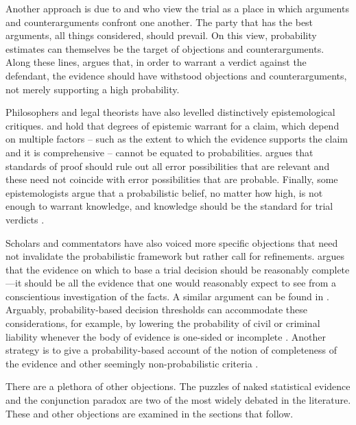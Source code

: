 \documentclass{article}
\begin{document}
Another approach is due to \cite{gordon2007} and \cite{prakken2009} who view the trial as a place in which  arguments and counterarguments confront one another.  The party that has the best arguments, all things considered, should prevail.  On this view, probability estimates can themselves be the target of objections and counterarguments. 
Along these lines,  \cite{stein2008} argues that,  in order to warrant a verdict against the defendant, the evidence should have withstood objections and counterarguments, not merely supporting a high probability.


Philosophers and 
legal theorists have also levelled distinctively epistemological critiques. \cite{ho2008philosophy} and \cite{Haack2014-HAAEMS} %
hold that degrees of epistemic warrant for a claim, which depend on multiple factors -- such as the extent to which the evidence supports the claim and it is comprehensive -- cannot be equated to probabilities.  \cite{gardiner2019ppa} argues that standards of proof should rule out all error possibilities that are relevant and these need not coincide with error possibilities that are probable. Finally, some epistemologists  argue that a probabilistic belief, no matter how high, is not enough to warrant knowledge, and knowledge should be the standard for trial verdicts \citep{DuffEtAl20017, littlejohn2017, BlomeTillmann2017, levanon2019, moss2020}.


 



Scholars and commentators have also voiced more specific objections that need not invalidate the probabilistic framework but rather call for  refinements.  \cite{nance2016} argues that the evidence on which to base a trial decision should be reasonably complete---it should be all the evidence that one would reasonably expect to see from a conscientious investigation of the facts. A similar argument can be found in \citep{davidsonpargetter1987}. Arguably, probability-based decision thresholds can accommodate these considerations, for example, by lowering the probability of civil or criminal liability whenever the body of evidence is one-sided or incomplete  \citep{Kaye79gate, Kaye1986Do, friedman1996}. Another strategy is to give a probability-based account of the notion of completeness of the evidence and other seemingly non-probabilistic criteria   \citep{Urbaniak2017Narration-in-ju}.

There are a plethora of other objections. The puzzles of naked statistical evidence and the conjunction paradox are two of the most widely debated in the literature. These and other objections are examined in the sections that follow.
\end{document}
